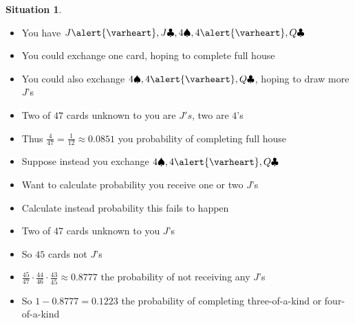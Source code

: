 \documentclass[handout]{beamer}
\theoremstyle{definition}
\newtheorem{situation}{Situation}
\newcommand{\hs}{\alert{\varheart}}
\newcommand{\s}{\spadesuit}
\newcommand{\cs}{\clubsuit}
\begin{document}
\begin{frame}
\begin{situation}
\begin{itemize}
\item You have $J\hs,J\cs,4\s,4\hs,Q\cs$
\item You could exchange one card, hoping to complete full house
\item You could also exchange $4\s,4\hs,Q\cs$, hoping to draw more $J$'s
\end{itemize}
\end{situation}
\begin{itemize}
\item Two of $47$ cards unknown to you are $J's$, two are $4$'s
\item Thus $\frac{4}{47}=\frac{1}{12}\approx 0.0851$ you probability
of completing full house
\end{itemize}
\end{frame}

\begin{frame}
\begin{itemize}
\item Suppose instead you exchange $4\s,4\hs,Q\cs$
\item Want to calculate probability you receive one or two $J$'s
\item Calculate instead probability this \alert{fails} to happen
\item Two of 47 cards unknown to you $J$'s
\item So $45$ cards \alert{not} $J$'s
\item $\frac{45}{47}\cdot\frac{44}{46}\cdot\frac{43}{45}\approx 0.8777$
the probability of \alert{not} receiving any $J$'s
\item So $1-0.8777=0.1223$ the probability of completing
three-of-a-kind or four-of-a-kind
\end{itemize}
\end{frame}
\end{document}
